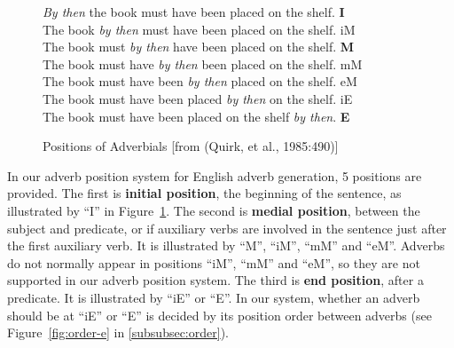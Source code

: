 \begin{singlespace}
\begin{figure}[htbp]
  \vspace*{-5mm}
  \begin{center}
    \leavevmode
    \small
    \begin{tabbing}
     {\em By then} the book must have been placed on the shelf. 
     \hspace{2cm} \= {\bf I}  \\
     The book {\em by then} must have been placed on the shelf.
     \hspace{2cm} \> iM \\
     The book must {\em by then} have been placed on the shelf. 
     \hspace{2cm} \> {\bf M}  \\
     The book must have {\em by then} been placed on the shelf. 
     \hspace{2cm} \> mM \\
     The book must have been {\em by then} placed on the shelf. 
     \hspace{2cm} \> eM \\
     The book must have been placed {\em by then} on the shelf. 
     \hspace{2cm} \> iE \\
     The book must have been placed on the shelf {\em by then}. 
     \hspace{2cm} \> {\bf E}  \\
    \end{tabbing}
  \end{center}
  \vspace*{-5mm}
  \caption{Positions of Adverbials [from (Quirk, et al., 1985:490)]}
  \label{fig:position}
\end{figure}
\end{singlespace}

In our adverb position system for English adverb generation, 5 positions 
are provided. 
The first is {\bf initial position}, the beginning of the sentence,
as illustrated by ``I'' in Figure~\ref{fig:position}. 
The second is {\bf medial position}, between the subject and predicate, or 
if auxiliary verbs are involved in the sentence just after the first 
auxiliary verb. It is illustrated by ``M'', ``iM'', ``mM'' and ``eM''.
Adverbs do not normally appear in positions ``iM'', ``mM'' and ``eM'', 
so they are not supported in our adverb position system. 
The third is {\bf end position}, after a predicate. 
It is illustrated by ``iE'' or ``E''. 
In our system, whether an adverb should be at ``iE'' or ``E'' is 
decided by its position order between adverbs 
(see Figure~\ref{fig:order-e} in \ref{subsubsec:order}).

